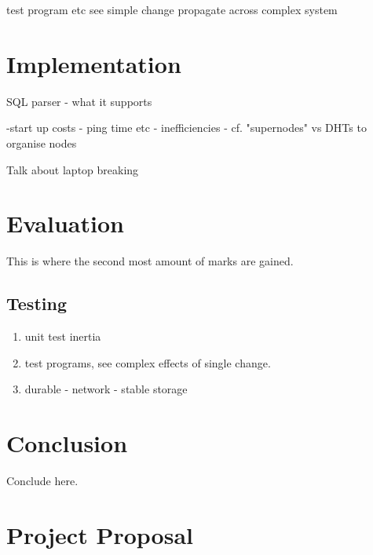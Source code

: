 \documentclass[12pt,twoside,notitlepage]{report}
\begin{document}
test program etc
see simple change propagate across complex system



\cleardoublepage
\chapter{Implementation}

SQL parser
- what it supports

-start up costs
  - ping time etc
  - inefficiencies
  - cf. "supernodes" vs DHTs to organise nodes

Talk about laptop breaking


\cleardoublepage
\chapter{Evaluation}

This is where the second most amount of marks are gained.

\section{Testing}

\begin{enumerate}
	\item unit test inertia
	\item test programs, see complex effects of single change.
	\item durable - network - stable storage
\end{enumerate}



\cleardoublepage
\chapter{Conclusion}

Conclude here.




\cleardoublepage



\cleardoublepage

\appendix

\chapter{Project Proposal}


\end{document}

